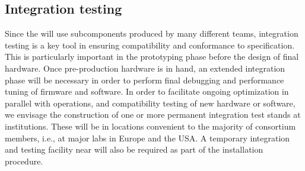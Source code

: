 \subsection{Integration testing}

Since the  will use subcomponents produced by many different teams,
integration testing is a key tool in ensuring compatibility and
conformance to specification. This is particularly important in the
prototyping phase before the design of final hardware. Once
pre-production hardware is in hand, an extended integration phase will
be necessary in order to perform final debugging and performance tuning
of firmware and software. In order to facilitate ongoing optimization in
parallel with operations, and compatibility testing of new hardware or
software, we envisage the construction of one or more permanent
integration test stands at  institutions. These will be in locations
convenient to the majority of consortium
members, i.e., at major labs in Europe and the USA. A temporary 
integration and testing facility near \surf will also be required as
part of the installation procedure.
